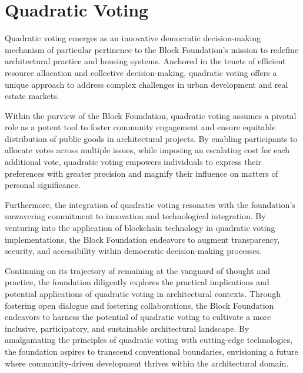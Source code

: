 \section{Quadratic Voting}

Quadratic voting emerges as an innovative democratic decision-making mechanism of particular pertinence to the Block Foundation's mission to redefine architectural practice and housing systems. Anchored in the tenets of efficient resource allocation and collective decision-making, quadratic voting offers a unique approach to address complex challenges in urban development and real estate markets.

Within the purview of the Block Foundation, quadratic voting assumes a pivotal role as a potent tool to foster community engagement and ensure equitable distribution of public goods in architectural projects. By enabling participants to allocate votes across multiple issues, while imposing an escalating cost for each additional vote, quadratic voting empowers individuals to express their preferences with greater precision and magnify their influence on matters of personal significance.

Furthermore, the integration of quadratic voting resonates with the foundation's unwavering commitment to innovation and technological integration. By venturing into the application of blockchain technology in quadratic voting implementations, the Block Foundation endeavors to augment transparency, security, and accessibility within democratic decision-making processes.

Continuing on its trajectory of remaining at the vanguard of thought and practice, the foundation diligently explores the practical implications and potential applications of quadratic voting in architectural contexts. Through fostering open dialogue and fostering collaborations, the Block Foundation endeavors to harness the potential of quadratic voting to cultivate a more inclusive, participatory, and sustainable architectural landscape. By amalgamating the principles of quadratic voting with cutting-edge technologies, the foundation aspires to transcend conventional boundaries, envisioning a future where community-driven development thrives within the architectural domain.